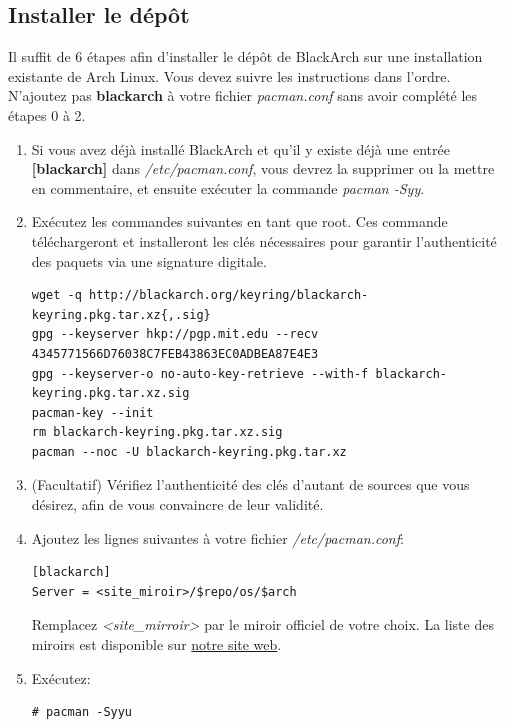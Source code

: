\documentclass[a4paper, oneside, 11pt]{book}
\begin{document}
\subsection{Installer le dépôt}
Il suffit de 6 étapes afin d'installer le dépôt de BlackArch sur une installation
existante de Arch Linux. Vous devez suivre les instructions dans l'ordre. N'ajoutez pas \textbf{blackarch}
à votre fichier \textit{pacman.conf} sans avoir complété les étapes 0 à 2.
\begin{enumerate} \itemsep4pt
\item Si vous avez déjà installé BlackArch et qu'il y existe déjà une entrée
\textbf{[blackarch]} dans \textit{/etc/pacman.conf}, vous devrez la supprimer ou
la mettre en commentaire, et ensuite exécuter la commande \textit{pacman -Syy}.
\item Exécutez les commandes suivantes en tant que root. Ces commande
téléchargeront et installeront les clés nécessaires pour garantir l'authenticité
des paquets via une signature digitale.
{\small
\color{gray}
\begin{verbatim}
wget -q http://blackarch.org/keyring/blackarch-keyring.pkg.tar.xz{,.sig}
gpg --keyserver hkp://pgp.mit.edu --recv 4345771566D76038C7FEB43863EC0ADBEA87E4E3
gpg --keyserver-o no-auto-key-retrieve --with-f blackarch-keyring.pkg.tar.xz.sig
pacman-key --init
rm blackarch-keyring.pkg.tar.xz.sig
pacman --noc -U blackarch-keyring.pkg.tar.xz
\end{verbatim}
}
\item (Facultatif) Vérifiez l'authenticité des clés d'autant de sources que vous
désirez, afin de vous convaincre de leur validité.
\item Ajoutez les lignes suivantes à votre fichier \textit{/etc/pacman.conf}:
{\small
\color{gray}
\begin{verbatim}
[blackarch]
Server = <site_miroir>/$repo/os/$arch
\end{verbatim}
}
Remplacez \textit{\textless site\_mirroir\textgreater} par le miroir officiel
de votre choix. La liste des miroirs est disponible sur
\href{http://www.blackarch.org/}{notre site web}.

\item Exécutez:
{\small
\color{gray}
\begin{verbatim}
# pacman -Syyu
\end{verbatim}
}
\end{enumerate}
\end{document}
